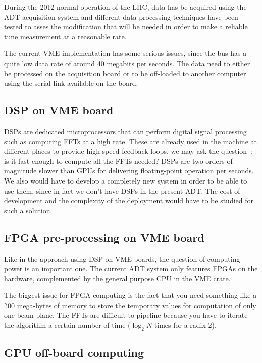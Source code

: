During the 2012 normal operation of the \gls{LHC}, data has be acquired using the \gls{ADT} acquisition system and different data processing techniques have been tested to asses the modification that will be needed in order to make a reliable \gls{tune} measurement at a reasonable rate\cite{HofleChamonix12}.

The current \gls{VME} implementation has some serious issues, since the bus has a quite low data rate of around 40 megabits per seconds. The data need to either be processed on the acquisition board or to be off-loaded to another computer using the serial link available on the board\cite{Baudrenghien:1124094}.

\subsection{DSP on VME board}

\Glspl{DSP} are dedicated microprocessors that can perform digital signal processing such as computing \glspl{FFT} at a high rate. These are already used in the machine at different places to provide high speed feedback loops. we may ask the question~: is it fast enough to compute all the \glspl{FFT} needed? \glspl{DSP} are two orders of magnitude slower than \glspl{GPU} for delivering floating-point operation per seconds. We also would have to develop a completely new system in order to be able to use them, since in fact we don't have \glspl{DSP} in the present \gls{ADT}. The cost of development and the complexity of the deployment would have to be studied for such a solution.

\subsection{FPGA pre-processing on VME board}

Like in the approach using \gls{DSP} on VME boards, the question of computing power is an important one. The current \gls{ADT} system only features \glspl{FPGA} on the hardware, complemented by the general purpose \gls{CPU} in the \gls{VME} crate.  

The biggest issue for \gls{FPGA} computing is the fact that you need something like a \~100 mega-bytes of memory to store the temporary values for computation of only one beam plane. The \glspl{FFT} are difficult to pipeline because you have to iterate the algorithm a certain number of time ($\log_{2} N$ times for a radix 2).

\subsection{GPU off-board computing}


